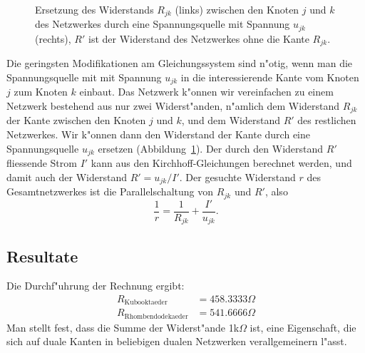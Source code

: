 \documentclass[a4paper,12pt]{article}
\begin{document}
\begin{figure}
\centering

\caption{Ersetzung des Widerstands $R_{jk}$ (links)
zwischen den Knoten $j$ und $k$
des Netzwerkes durch eine Spannungsquelle mit Spannung $u_{jk}$ (rechts),
$R'$ ist der Widerstand des Netzwerkes ohne die Kante $R_{jk}$.
\label{spannungsquelle}}
\end{figure}
Die geringsten Modifikationen am Gleichungssystem sind n"otig, wenn
man die Spannungsquelle mit mit Spannung $u_{jk}$ in die interessierende
Kante vom Knoten $j$ zum Knoten $k$ einbaut.
Das Netzwerk k"onnen wir vereinfachen zu einem Netzwerk bestehend
aus nur zwei Widerst"anden, n"amlich dem Widerstand $R_{jk}$ der Kante zwischen
den Knoten $j$ und $k$, und dem Widerstand $R'$ des restlichen Netzwerkes.
Wir k"onnen dann den Widerstand der Kante durch eine Spannungsquelle
$u_{jk}$ ersetzen (Abbildung~\ref{spannungsquelle}). 
Der durch den Widerstand $R'$ fliessende Strom $I'$ kann aus den
Kirchhoff-Gleichungen berechnet werden, und damit
auch der Widerstand $R'=u_{jk}/I'$.
Der gesuchte Widerstand $r$ des Gesamtnetzwerkes ist die Parallelschaltung
von $R_{jk}$ und $R'$, also
\[
\frac1r=\frac1{R_{jk}}+\frac{I'}{u_{jk}}.
\]

\subsection{Resultate}
Die Durchf"uhrung der Rechnung ergibt:
\begin{align*}
R_{\text{Kubooktaeder}}
&=
458.3333\Omega
\\
R_{\text{Rhombendodekaeder}}
&=
541.6666\Omega
\end{align*}
Man stellt fest, dass die Summe der Widerst"ande 1k$\Omega$ ist, 
eine Eigenschaft, die sich auf duale Kanten in beliebigen dualen
Netzwerken verallgemeinern l"asst.
\end{document}
